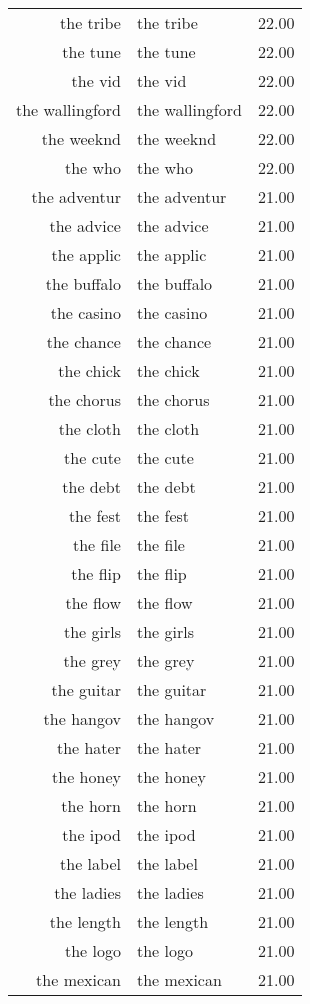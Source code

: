 \begin{table}[ht]
\begin{tabular}{rlr}
  the tribe & the tribe & 22.00 \\ 
  the tune & the tune & 22.00 \\ 
  the vid & the vid & 22.00 \\ 
  the wallingford & the wallingford & 22.00 \\ 
  the weeknd & the weeknd & 22.00 \\ 
  the who & the who & 22.00 \\ 
  the adventur & the adventur & 21.00 \\ 
  the advice & the advice & 21.00 \\ 
  the applic & the applic & 21.00 \\ 
  the buffalo & the buffalo & 21.00 \\ 
  the casino & the casino & 21.00 \\ 
  the chance & the chance & 21.00 \\ 
  the chick & the chick & 21.00 \\ 
  the chorus & the chorus & 21.00 \\ 
  the cloth & the cloth & 21.00 \\ 
  the cute & the cute & 21.00 \\ 
  the debt & the debt & 21.00 \\ 
  the fest & the fest & 21.00 \\ 
  the file & the file & 21.00 \\ 
  the flip & the flip & 21.00 \\ 
  the flow & the flow & 21.00 \\ 
  the girls & the girls & 21.00 \\ 
  the grey & the grey & 21.00 \\ 
  the guitar & the guitar & 21.00 \\ 
  the hangov & the hangov & 21.00 \\ 
  the hater & the hater & 21.00 \\ 
  the honey & the honey & 21.00 \\ 
  the horn & the horn & 21.00 \\ 
  the ipod & the ipod & 21.00 \\ 
  the label & the label & 21.00 \\ 
  the ladies & the ladies & 21.00 \\ 
  the length & the length & 21.00 \\ 
  the logo & the logo & 21.00 \\ 
  the mexican & the mexican & 21.00 \\ 

\end{tabular}
\end{table}
